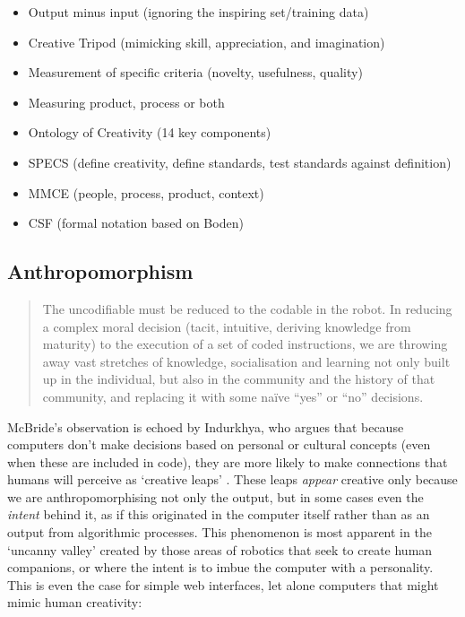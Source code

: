 \begin{itemize}
  \item Output minus input (ignoring the inspiring set/training data)
  \item Creative Tripod (mimicking skill, appreciation, and imagination)
  \item Measurement of specific criteria (novelty, usefulness, quality)
  \item Measuring product, process or both
  \item Ontology of Creativity (14 key components)
  \item \ac{SPECS} (define creativity, define standards, test standards against definition)
  \item \ac{MMCE} (people, process, product, context)
  \item \ac{CSF} (formal notation based on Boden)
\end{itemize}


\subsection{Anthropomorphism}
\label{ss:anthropomorphism}

\begin{quotation}
  The uncodifiable must be reduced to the codable in the robot. In reducing a complex moral decision (tacit, intuitive, deriving knowledge from maturity) to the execution of a set of coded instructions, we are throwing away vast stretches of knowledge, socialisation and learning not only built up in the individual, but also in the community and the history of that community, and replacing it with some na{\"i}ve ``yes'' or ``no'' decisions. 
\end{quotation}

McBride's observation is echoed by Indurkhya, who argues that because computers don't make decisions based on personal or cultural concepts (even when these are included in code), they are more likely to make connections that humans will perceive as `creative leaps' \autocite*{Indurkhya1997}. These leaps \emph{appear} creative only because we are anthropomorphising not only the output, but in some cases even the \emph{intent} behind it, as if this originated in the computer itself rather than as an output from algorithmic processes. This phenomenon is most apparent in the `uncanny valley' created by those areas of robotics that seek to create human companions, or where the intent is to imbue the computer with a personality. This is even the case for simple web interfaces, let alone computers that might mimic human creativity:

